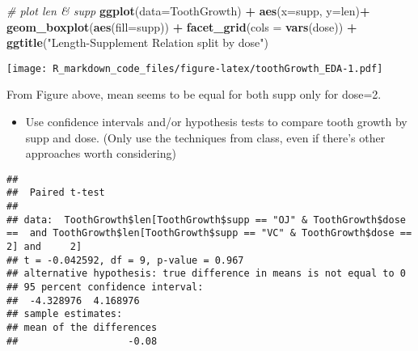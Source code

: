 \documentclass[]{article}
\newenvironment{Shaded}{\begin{snugshade}}{\end{snugshade}}
\newcommand{\CommentTok}[1]{\textcolor[rgb]{0.56,0.35,0.01}{\textit{#1}}}
\newcommand{\DataTypeTok}[1]{\textcolor[rgb]{0.13,0.29,0.53}{#1}}
\newcommand{\DecValTok}[1]{\textcolor[rgb]{0.00,0.00,0.81}{#1}}
\newcommand{\KeywordTok}[1]{\textcolor[rgb]{0.13,0.29,0.53}{\textbf{#1}}}
\newcommand{\NormalTok}[1]{#1}
\newcommand{\OperatorTok}[1]{\textcolor[rgb]{0.81,0.36,0.00}{\textbf{#1}}}
\newcommand{\OtherTok}[1]{\textcolor[rgb]{0.56,0.35,0.01}{#1}}
\newcommand{\StringTok}[1]{\textcolor[rgb]{0.31,0.60,0.02}{#1}}
\providecommand{\tightlist}{%
  \setlength{\itemsep}{0pt}\setlength{\parskip}{0pt}}
\begin{document}
\begin{Shaded}
\begin{Highlighting}[]
\CommentTok{# plot len & supp}
\KeywordTok{ggplot}\NormalTok{(}\DataTypeTok{data=}\NormalTok{ToothGrowth) }\OperatorTok{+}\StringTok{ }
\StringTok{  }\KeywordTok{aes}\NormalTok{(}\DataTypeTok{x=}\NormalTok{supp, }\DataTypeTok{y=}\NormalTok{len)}\OperatorTok{+}
\StringTok{  }\KeywordTok{geom_boxplot}\NormalTok{(}\KeywordTok{aes}\NormalTok{(}\DataTypeTok{fill=}\NormalTok{supp)) }\OperatorTok{+}
\StringTok{  }\KeywordTok{facet_grid}\NormalTok{(}\DataTypeTok{cols =} \KeywordTok{vars}\NormalTok{(dose)) }\OperatorTok{+}
\StringTok{  }\KeywordTok{ggtitle}\NormalTok{(}\StringTok{"Length-Supplement Relation split by dose"}\NormalTok{)}
\end{Highlighting}
\end{Shaded}

\texttt{[image: R\_markdown\_code\_files/figure-latex/toothGrowth\_EDA-1.pdf]}

From Figure above, mean seems to be equal for both supp only for dose=2.

\begin{itemize}
\tightlist
\item
  Use confidence intervals and/or hypothesis tests to compare tooth
  growth by supp and dose. (Only use the techniques from class, even if
  there's other approaches worth considering)
\end{itemize}

\begin{Shaded}
\end{Shaded}

\begin{verbatim}
## 
##  Paired t-test
## 
## data:  ToothGrowth$len[ToothGrowth$supp == "OJ" & ToothGrowth$dose ==  and ToothGrowth$len[ToothGrowth$supp == "VC" & ToothGrowth$dose ==     2] and     2]
## t = -0.042592, df = 9, p-value = 0.967
## alternative hypothesis: true difference in means is not equal to 0
## 95 percent confidence interval:
##  -4.328976  4.168976
## sample estimates:
## mean of the differences 
##                   -0.08
\end{verbatim}
\end{document}
